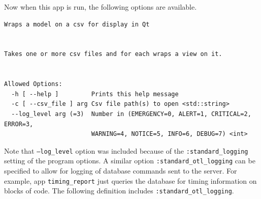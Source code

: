 \documentclass[11pt]{article}
\begin{document}
  Now when this app is run, the following options are available.


\lstset{language=Ruby}
\begin{lstlisting}
Wraps a model on a csv for display in Qt

 
Takes one or more csv files and for each wraps a view on it.


Allowed Options:
  -h [ --help ]         Prints this help message
  -c [ --csv_file ] arg Csv file path(s) to open <std::string>
  --log_level arg (=3)  Number in (EMERGENCY=0, ALERT=1, CRITICAL=2, ERROR=3, 
                        WARNING=4, NOTICE=5, INFO=6, DEBUG=7) <int>
\end{lstlisting}



  Note that \texttt{--log\_level} option was included because of the
  \texttt{:standard\_logging} setting of the program options. A similar option
  \texttt{:standard\_otl\_logging} can be specified to allow for logging of
  database commands sent to the server. For example, app
  \texttt{timing\_report} just queries the database for timing information on
  blocks of code. The following definition includes
  \texttt{:standard\_otl\_logging}.
\end{document}
